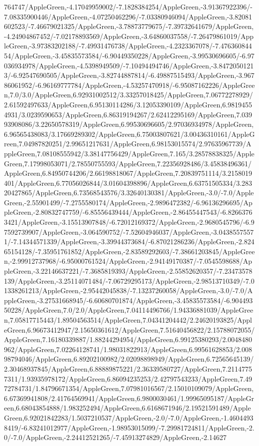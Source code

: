 {\begin{tikzternal}
764747/AppleGreen,-4.17049959002/-7.1828384254/AppleGreen,-3.91367922396/-7.08335900446/AppleGreen,-4.07250462296/-7.03380946094/AppleGreen,-3.82081602523/-7.46679021325/AppleGreen,-3.78873779675/-7.39732641679/AppleGreen,-4.24904867452/-7.02178893569/AppleGreen,-3.64860037558/-7.26479861019/AppleGreen,-3.97383202188/-7.49931476738/AppleGreen,-4.2323367078/-7.47636084454/AppleGreen,-3.45835573584/-6.90449350228/AppleGreen,-3.99530696605/-6.97036934978/AppleGreen,-4.5398949509/-7.10494494746/AppleGreen,-3.84720501213/-6.92547690505/AppleGreen,-3.82744887814/-6.49887515493/AppleGreen,-3.96786061952/-6.96169777784/AppleGreen,-4.53257470918/-6.95087162226/AppleGreen,7.0/3.0/AppleGreen,6.92931002512/3.33257018425/AppleGreen,7.06772278929/2.61592497633/AppleGreen,6.95130114286/3.12053390109/AppleGreen,6.98194554931/3.0239590653/AppleGreen,6.86319194267/2.62412295169/AppleGreen,7.03993908086/3.22650578319/AppleGreen,6.99530696605/2.97036934978/AppleGreen,6.96565438083/3.17669289302/AppleGreen,6.75003807621/3.00436310161/AppleGreen,7.04987820251/2.99651217631/AppleGreen,6.98153015574/2.97635967739/AppleGreen,7.08108555942/3.38147756429/AppleGreen,7.165/3.28578838325/AppleGreen,7.17998053071/2.78550755593/AppleGreen,7.22356928486/3.45838496361/AppleGreen,6.84950744206/2.66198818067/AppleGreen,7.20839751114/3.2158019401/AppleGreen,6.77056026844/3.01604398896/AppleGreen,6.63751505334/3.28320427865/AppleGreen,6.73568543576/3.32640130381/AppleGreen,-3.0/-7.0/AppleGreen,-2.55901499/-7.2755580174/AppleGreen,-2.9896472382/-6.96136296695/AppleGreen,-2.80832747759/-6.85556439444/AppleGreen,-2.86455447543/-6.82663763421/AppleGreen,-3.15513907848/-6.72012169372/AppleGreen,-2.9680545796/-6.97592739907/AppleGreen,-3.064590752/-7.52604946037/AppleGreen,-3.04385575571/-7.14344571339/AppleGreen,-3.39944373684/-6.87021286236/AppleGreen,-2.82465154128/-7.35951761852/AppleGreen,-2.83589292603/-7.38661203845/AppleGreen,-2.99912737968/-6.95000761524/AppleGreen,-2.94149170387/-7.0545598688/AppleGreen,-3.22146637221/-7.3685819393/AppleGreen,-2.55852620357/-7.23473578139/AppleGreen,-3.25114071484/-7.06729295173/AppleGreen,-2.98513710349/-7.01338261213/AppleGreen,-2.95442045838/-7.13237260058/AppleGreen,-3.0/-7.0/AppleGreen,-3.27531668945/-6.60680701874/AppleGreen,-3.45835573584/-6.90449350228/AppleGreen,7.0/2.0/AppleGreen,7.04114496766/1.94336881039/AppleGreen,7.05817715443/1.89504563514/AppleGreen,7.04341204442/2.24620193825/AppleGreen,6.96673412947/2.15650361612/AppleGreen,7.51640456822/2.15788072055/AppleGreen,7.16180339887/1.88244294954/AppleGreen,6.99125380293/2.0048480962/AppleGreen,7.02264128741/1.98031822913/AppleGreen,6.99561628853/2.00898794046/AppleGreen,6.89202100982/2.02098898949/AppleGreen,6.72565645139/2.30468937845/AppleGreen,6.88889875221/2.36339580727/AppleGreen,7.21147757311/1.93935978172/AppleGreen,6.86094235253/2.42797543233/AppleGreen,7.4972784731/1.84796671354/AppleGreen,7.07981016567/2.15010109079/AppleGreen,6.67369941808/2.41764569941/AppleGreen,6.9800030461/1.99965095187/AppleGreen,6.68043854888/1.983252494/AppleGreen,6.6168671946/2.19521591489/AppleGreen,6.92021842283/1.5037210537/AppleGreen,-2.0/-7.0/AppleGreen,-1.46044938419/-6.83241012977/AppleGreen,-1.98953015099/-7.29981724811/AppleGreen,-2.0/-7.0/AppleGreen,-2.24412521265/-7.45913274829/AppleGreen,-2.14627
\end{tikzternal}}
